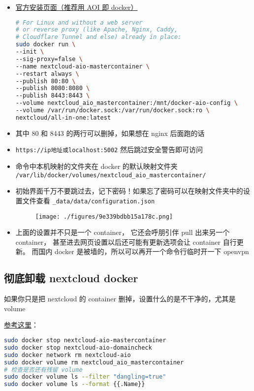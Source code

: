 
\begin{itemize}
\item \href{https://nextcloud.com/install/}{官方安装页面（推荐用 AOI 即 docker）}
\begin{lstlisting}[language=bash]
# For Linux and without a web server
# or reverse proxy (like Apache, Nginx, Caddy,
# Cloudflare Tunnel and else) already in place:
sudo docker run \
--init \
--sig-proxy=false \
--name nextcloud-aio-mastercontainer \
--restart always \
--publish 80:80 \
--publish 8080:8080 \
--publish 8443:8443 \
--volume nextcloud_aio_mastercontainer:/mnt/docker-aio-config \
--volume /var/run/docker.sock:/var/run/docker.sock:ro \
nextcloud/all-in-one:latest
\end{lstlisting}
\item 其中 80 和 8443 的两行可以删掉，如果想在 nginx 后面跑的话
\item \verb`https://ip地址或localhost:5002` 然后跳过安全警告即可访问
\item 命令中本机映射的文件夹在 docker 的默认映射文件夹 \verb`/var/lib/docker/volumes/nextcloud_aio_mastercontainer/`
\item 初始界面千万不要跳过去，记下密码！如果忘了密码可以在映射文件夹中的设置文件查看 \verb`_data/data/configuration.json`
\begin{figure}[ht]
\centering
\texttt{[image: ./figures/9e339bdbb15a178c.png]}
\caption{} \label{fig_nxclou_1}
\end{figure}
\item 上面的设置并不只是一个 container， 它还会呼朋引伴 pull 出来另一个 container， 甚至进去网页设置以后还可能有更新选项会让 container 自行更新。 而国内 docker 是被墙的，所以可以再开一个命令行临时开一下 openvpn
\end{itemize}

\subsection{彻底卸载 nextcloud docker}
如果你只是把 nextcloud 的 container 删掉，设置什么的是不干净的，尤其是 volume

\href{https://github.com/nextcloud/all-in-one#how-to-properly-reset-the-instance}{参考这里}：
\begin{lstlisting}[language=bash]
sudo docker stop nextcloud-aio-mastercontainer
sudo docker stop nextcloud-aio-domaincheck
sudo docker network rm nextcloud-aio
sudo docker volume rm nextcloud_aio_mastercontainer
# 检查是否还有残留 volume
sudo docker volume ls --filter "dangling=true"
sudo docker volume ls --format {{.Name}}
\end{lstlisting}
